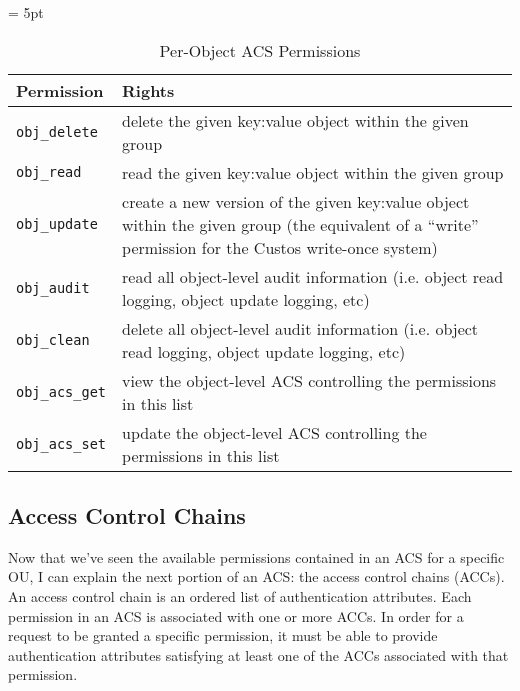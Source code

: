 \begin{table}[!tbh]
  \vspace{1ex}
  \begin{center}
    \tabulinesep = 5pt
    \begin{tabu} to \textwidth
      { | X[1,l,m]
        | X[4,l,m]
        | }
      \hline
      \textbf{Permission}
      & \textbf{Rights}
      \\ \hline
      \texttt{obj\_delete}
      & delete the given key:value object within the given group
      \\ \hline
      \texttt{obj\_read}
      & read the given key:value object within the given group
      \\ \hline
      \texttt{obj\_update}
      & create a new version of the given key:value object within the given group
      \newline
      (the equivalent of a ``write'' permission for the Custos write-once system)
      \\ \hline
      \texttt{obj\_audit}
      & read all object-level audit information
      \newline
      (i.e. object read logging, object update logging, etc)
      \\ \hline
      \texttt{obj\_clean}
      & delete all object-level audit information
      \newline
      (i.e. object read logging, object update logging, etc)
      \\ \hline
      \texttt{obj\_acs\_get}
      & view the object-level ACS controlling the permissions in this list
      \\ \hline
      \texttt{obj\_acs\_set}
      & update the object-level ACS controlling the permissions in this list
      \\ \hline
    \end{tabu}
  \end{center}
  \caption{Per-Object ACS Permissions}
  \label{tab:permissions-object}
\end{table}

\subsection{Access Control Chains}

Now that we've seen the available permissions contained in an ACS for
a specific OU, I can explain the next portion of an ACS: the access
control chains (ACCs). An access control chain is an ordered list of
authentication attributes. Each permission in an ACS is associated
with one or more ACCs. In order for a request to be granted a specific
permission, it must be able to provide authentication attributes
satisfying at least one of the ACCs associated with that permission.

